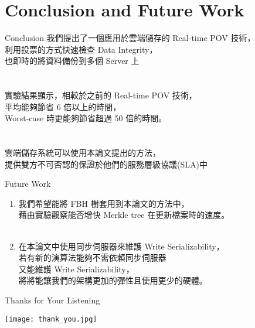 \section{Conclusion and Future Work}

\begin{frame}{Conclusion}
	我們提出了一個應用於雲端儲存的 Real-time POV 技術，\\
    利用投票的方式快速檢查 Data Integrity，\\
    也即時的將資料備份到多個 Server 上\\
    ~\\
    ~\\
    實驗結果顯示，相較於之前的 Real-time POV 技術，\\
    平均能夠節省 6 倍以上的時間，\\
    Worst-case 時更能夠節省超過 50 倍的時間。\\
    ~\\
    ~\\
    雲端儲存系統可以使用本論文提出的方法，\\
    提供雙方不可否認的保證於他們的服務層級協議(SLA)中
\end{frame}

\begin{frame}{Future Work}
	\begin{enumerate}
		\item 我們希望能將 FBH 樹套用到本論文的方法中，\\
        藉由實驗觀察能否增快 Merkle tree 在更新檔案時的速度。\\
        ~\\
        \item 在本論文中使用同步伺服器來維護 Write Serializability，\\
        若有新的演算法能夠不需依賴同步伺服器\\
        又能維護 Write Serializability，\\
        將將能讓我們的架構更加的彈性且使用更少的硬體。
	\end{enumerate}
\end{frame}

\begin{frame}{Thanks for Your Listening}
	\begin{center}
		\texttt{[image: thank\_you.jpg]}
	\end{center}	
\end{frame}